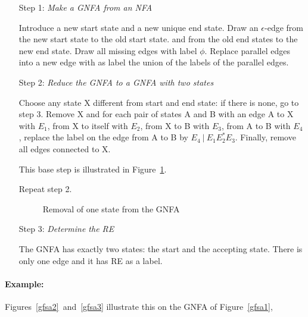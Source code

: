 \begin{itemize}
\item[Step 1:]  {\em Make a GNFA from an NFA}

Introduce a new start state and a new unique end state. Draw an
$\epsilon$-edge from the new start state to the old start state. and
from the old end states to the new end state. Draw all missing edges
with label $\phi$. Replace parallel edges into a new edge with as
label the union of the labels of the parallel edges.

\item[Step 2:]  {\em Reduce the GNFA to a GNFA with two states}

Choose any state X different from start and end state: if there is
none, go to step 3. Remove X and for each pair of states A and B with
an edge
A to X with $E_1$,
%
from X to itself with $E_2$,
%
from X to B with $E_3$,
%
from A to B with $E_4$,
%
replace the label on the edge from A to B by
$E_4~|~E_1E_2^*E_3$. Finally, remove all edges connected to X.

This base step is illustrated in Figure~\ref{redgfsa1}.

Repeat step 2.

\begin{figure}[h]
\caption{Removal of one state from the GNFA \label{redgfsa1}}
\end{figure}


\item[Step 3:]  {\em Determine the RE}

The GNFA has exactly two states: the start and the accepting
state. There is only one edge and it has RE as a label.
\end{itemize}

\paragraph{Example:} Figures~\ref{gfsa2}~and~\ref{gfsa3} illustrate
this on the GNFA of Figure~\ref{gfsa1},



